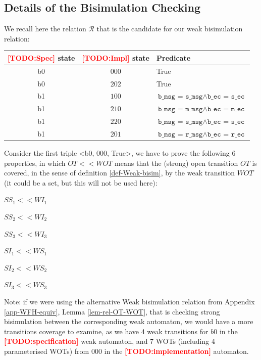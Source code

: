 \documentclass{lmcs}
\newcommand{\TODO}[1]{\textcolor{red}{\textbf{[TODO:#1]}}}
\begin{document}
        \subsection{Details of the Bisimulation Checking}
         
We recall here the relation $\mathcal{R}$ that is the candidate for our weak bisimulation relation:

\bigskip
  \begin{tabular}{|c|c|l|}
\hline
    \TODO{Spec} state & \TODO{Impl} state & Predicate\\
    \hline
    b0 & $000$ & True\\
    b0 & $202$ & True\\
    b1 & $100$ & $\texttt{b\_msg = s\_msg} \land \texttt{b\_ec = s\_ec}$\\
    b1 & $210$ & $\texttt{b\_msg = m\_msg} \land \texttt{b\_ec = m\_ec}$\\
    b1 & $220$ & $\texttt{b\_msg = s\_msg} \land \texttt{b\_ec = s\_ec}$\\
    b1 & $201$ & $\texttt{b\_msg = r\_msg} \land \texttt{b\_ec = r\_ec}$\\
    \hline
    \end{tabular}


\bigskip
Consider the first triple <b0, 000, True>, we have to prove the following 6 properties, in which $OT<<WOT$ means that the (strong) open transition $OT$ is covered, in the sense
of definition \ref{def-Weak-bisim}, by the weak transition $WOT$ (it could be a set, but this will not be used here):

\bigskip
\begin{minipage}{0.2\linewidth} 	 
$SS_1 << WI_1$

$SS_2 << WI_2$

$SS_3 << WI_3$
\end{minipage}
\hspace{1cm}
\begin{minipage}{0.4\linewidth}
$SI_1 << WS_1$

$SI_2 << WS_2$

$SI_3 << WS_3$
\end{minipage}




\bigskip

         
         Note: if we were using the alternative Weak bisimulation relation from Appendix \ref{app-WFH-equiv}, Lemma \ref{lem-rel-OT-WOT}, that is checking strong bisimulation between the corresponding 
weak automaton, we would have a more transitions coverage to examine, as we have 4 weak transitions for $b0$ in the \TODO{specification} weak automaton, and 7 WOTs (including 4 
parameterised WOTs) from 000 in the \TODO{implementation} automaton.
         
\end{document}
